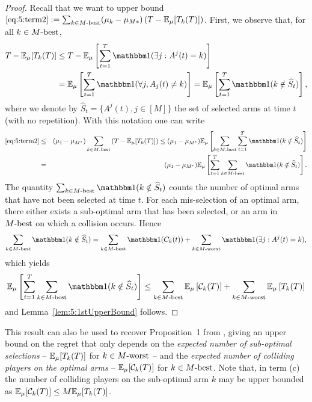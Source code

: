 \begin{proof}
  Recall that we want to upper bound
  $ \ref{eq:5:term2} : = \sum_{k \in M\text{-}\mathrm{best}} (\mu_k - \mu_{M*}) \left(T - \mathbb{E}_{\mu}[T_k(T)]\right)$.
  First, we observe that, for all $k\in M\text{-}\mathrm{best}$,
  \begin{eqnarray*}
    T - \E_{\mu}[T_k(T)] & \leq T - \E_{\mu}\left[\sum_{t=1}^T \indic(\exists j : A^j(t) = k)\right] \\
    & = \E_{\mu}\left[\sum_{t=1}^T \indic(\forall j, A_j(t) \neq k)\right] = \E_{\mu}\left[\sum_{t=1}^T \indic(k \notin \widehat{S}_t)\right],
  \end{eqnarray*}
  where we denote by $\widehat{S}_t = \{A^j(t), j \in [M]\}$ the set of selected arms at time $t$ (with no repetition). With this notation one can write
  \begin{eqnarray*}
  \ref{eq:5:term2} & \leq & (\mu_1 - \mu_{M^*})  \sum_{k \in \Mbest} \left(T - \E_{\mu}[T_k(T)]\right) \leq  (\mu_1 - \mu_{M^*})  \E_{\mu}\left[\sum_{k \in \Mbest} \sum_{t = 1}^T \indic(k \notin \widehat{S}_t)\right] \\
  & = &  (\mu_1 - \mu_{M^*})  \E_{\mu}\left[ \sum_{t = 1}^T \sum_{k \in \Mbest}\indic(k \notin \widehat{S}_t)\right].
  \end{eqnarray*}
  The quantity $\sum_{k \in \Mbest}\indic(k \notin \widehat{S}_t)$ counts the number of optimal arms that have not been selected at time $t$. For each mis-selection of an optimal arm, there either exists a sub-optimal arm that has been selected, or an arm in $M\text{-}\mathrm{best}$ on which a collision occurs. Hence
  \[\sum_{k \in \Mbest}\indic(k \notin \widehat{S}_t) = \sum_{k \in \Mbest}\indic(C_k(t)) + \sum_{k \in \Mworst} \indic(\exists j : A^j(t) = k),\]
  which yields
  \[\E_{\mu}\left[ \sum_{t = 1}^T \sum_{k \in \Mbest}\indic(k \notin \widehat{S}_t)\right] \leq \sum_{k \in \Mbest}\E_{\mu}\left[\cC_k(T)\right] + \sum_{k \in \Mworst} \E_{\mu}\left[T_k(T)\right]\]
  and Lemma~\ref{lem:5:1stUpperBound} follows.
\end{proof}


This result can also be used to recover Proposition~1 from \cite{Anandkumar11}, giving an upper bound on the regret that only depends on
the \emph{expected number of sub-optimal selections} -- $\mathbb{E}_{\mu}[T_k(T)]$ for $k \in M\text{-}\mathrm{worst}$ --
and the \emph{expected number of colliding players on the optimal arms} -- $\mathbb{E}_{\mu}[\mathcal{C}_k(T)]$ for $k \in M\text{-}\mathrm{best}$. Note that, in term (c) the number of colliding players on the sub-optimal arm $k$ may be upper bounded as $\mathbb{E}_{\mu}[\mathcal{C}_k(T)] \leq M \mathbb{E}_{\mu}[T_k(T)]$.
%


